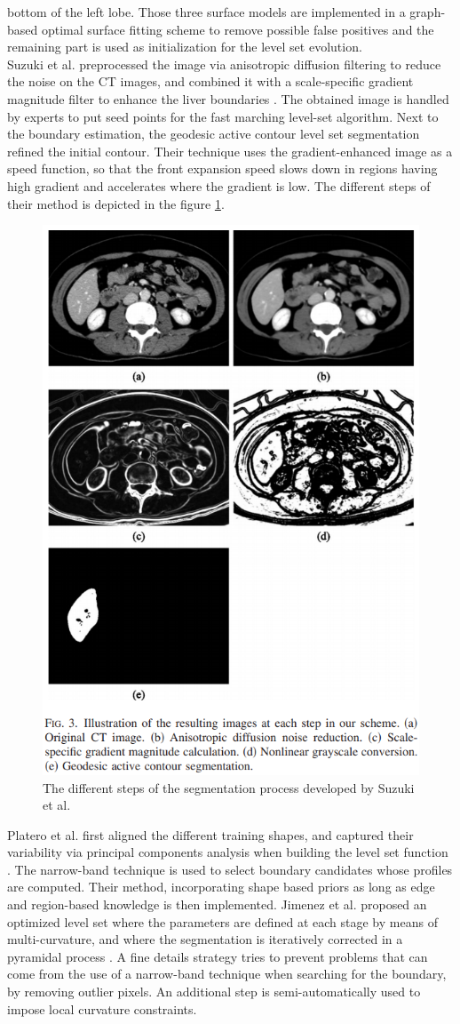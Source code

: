 \documentclass[]{article}
\begin{document}
	bottom of the left lobe. Those three surface models are implemented in a
	graph-based optimal surface fitting scheme to remove possible false
	positives and the remaining part is used as initialization for the level
	set evolution.\\
	Suzuki et al. preprocessed the image via anisotropic diffusion
	filtering to reduce the noise on the CT images, and combined it with a
	scale-specific gradient magnitude filter to enhance the liver
	boundaries \cite{Suzuki2010}. The obtained image is handled by experts to put seed points
	for the fast marching level-set algorithm. Next to the boundary
	estimation, the geodesic active contour level set segmentation refined
	the initial contour. Their technique uses the gradient-enhanced image as
	a speed function, so that the front expansion speed slows down in
	regions having high gradient and accelerates where the gradient is low.
	The different steps of their method is depicted in the figure \ref{Suzuki2010_Fig3}.
	
	\begin{figure}[ht!]
		\centering
		\includegraphics[width=0.5\linewidth]{images/image24}
		\caption{The different steps of the segmentation process developed by Suzuki et al. \cite{Suzuki2010}}
		\label{Suzuki2010_Fig3}
	\end{figure}
	
	
	Platero et al. first aligned the different training shapes, and captured
	their variability via principal components analysis when building the
	level set function \cite{Platero2011}. The narrow-band technique is used to select boundary
	candidates whose profiles are computed. Their method, incorporating
	shape based priors as long as edge and region-based knowledge is then
	implemented.
	Jimenez et al. proposed an optimized level set where the parameters are
	defined at each stage by means of multi-curvature, and where the
	segmentation is iteratively corrected in a pyramidal process \cite{Jimenez-Carretero2011}. A fine
	details strategy tries to prevent problems that can come from the use of
	a narrow-band technique when searching for the boundary, by removing
	outlier pixels. An additional step is semi-automatically used to impose
	local curvature constraints.
	
\end{document}
